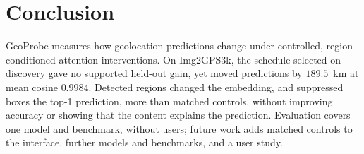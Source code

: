 \section{Conclusion}

GeoProbe measures how geolocation predictions change under controlled,
region-conditioned attention interventions. On Img2GPS3k, the
schedule selected on discovery gave no supported held-out gain, yet moved
predictions by $189.5$~km at mean cosine $0.9984$. Detected regions changed
the embedding, and suppressed boxes the top-1 prediction, more than matched
controls, without improving accuracy or showing that the content explains the
prediction. Evaluation covers one model and benchmark,
without users; future work adds matched controls to the interface, further
models and benchmarks, and a user study.
